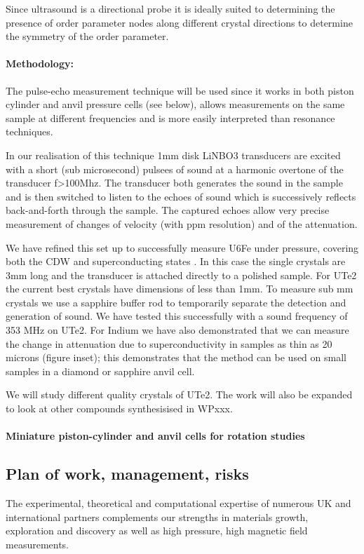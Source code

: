 Since ultrasound is a directional probe it is ideally suited to determining the presence of order parameter nodes along different crystal directions to determine the symmetry of the order parameter.

\paragraph{Methodology:}
The pulse-echo measurement technique will be used since it works in both piston cylinder and anvil pressure cells (see below), allows measurements on the same sample at different frequencies and is more easily interpreted than resonance techniques.

In our realisation of this technique 1mm disk LiNBO3 transducers are excited with a short (sub microsecond) pulsees of sound at a harmonic overtone of the transducer f>100Mhz. The transducer both generates the sound in the sample and is then switched to listen to the echoes of sound which is successively reflects back-and-forth through the sample. The captured echoes allow very precise measurement of changes of velocity (with ppm resolution) and of the attenuation.

We have refined this set up to successfully measure U6Fe under pressure, covering both the CDW and superconducting states . In this case the single crystals are 3mm long and the transducer is attached directly to a polished sample. For UTe2 the current best crystals have dimensions of less than 1mm. To measure sub mm crystals we use a sapphire buffer rod to temporarily separate the detection and generation of sound. We have tested this successfully with a sound frequency of 353 MHz on UTe2. For Indium we have also demonstrated that we can measure the change in attenuation due to superconductivity in samples as thin as 20 microns (figure inset); this demonstrates that the method can be used on small samples in a diamond or sapphire anvil cell.

We will study different quality crystals of UTe2.  The work will also be expanded to look at other compounds synthesisised in WPxxx. 
\paragraph{Miniature piston-cylinder and anvil cells for rotation studies}

\subsection*{Plan of work, management,
risks}
\noindent
The experimental, theoretical and computational expertise of numerous UK and international partners complements our strengths in materials growth, exploration and discovery as well as high pressure, high magnetic field measurements. 

